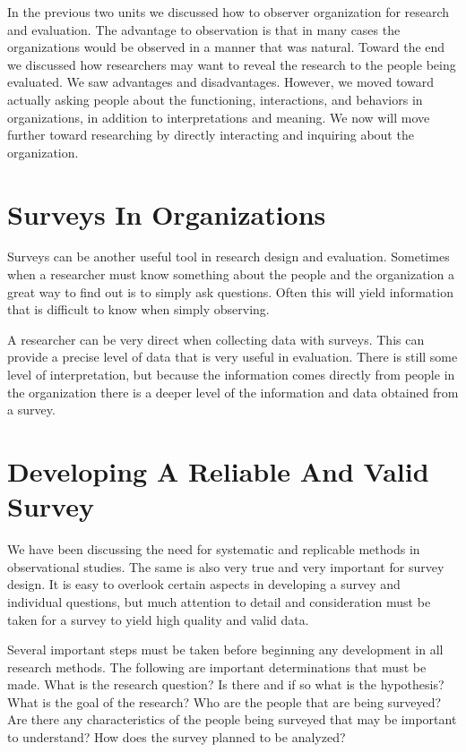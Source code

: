 \documentclass[]{book}
\theoremstyle{definition}
\theoremstyle{definition}
\theoremstyle{definition}
\theoremstyle{remark}
\begin{document}
In the previous two units we discussed how to observer organization for
research and evaluation. The advantage to observation is that in many
cases the organizations would be observed in a manner that was natural.
Toward the end we discussed how researchers may want to reveal the
research to the people being evaluated. We saw advantages and
disadvantages. However, we moved toward actually asking people about the
functioning, interactions, and behaviors in organizations, in addition
to interpretations and meaning. We now will move further toward
researching by directly interacting and inquiring about the
organization.

\hypertarget{surveys-in-organizations}{%
\section{Surveys In Organizations}\label{surveys-in-organizations}}

Surveys can be another useful tool in research design and evaluation.
Sometimes when a researcher must know something about the people and the
organization a great way to find out is to simply ask questions. Often
this will yield information that is difficult to know when simply
observing.

A researcher can be very direct when collecting data with surveys. This
can provide a precise level of data that is very useful in evaluation.
There is still some level of interpretation, but because the information
comes directly from people in the organization there is a deeper level
of the information and data obtained from a survey.

\hypertarget{developing-a-reliable-and-valid-survey}{%
\section{Developing A Reliable And Valid
Survey}\label{developing-a-reliable-and-valid-survey}}

We have been discussing the need for systematic and replicable methods
in observational studies. The same is also very true and very important
for survey design. It is easy to overlook certain aspects in developing
a survey and individual questions, but much attention to detail and
consideration must be taken for a survey to yield high quality and valid
data.

Several important steps must be taken before beginning any development
in all research methods. The following are important determinations that
must be made. What is the research question? Is there and if so what is
the hypothesis? What is the goal of the research? Who are the people
that are being surveyed? Are there any characteristics of the people
being surveyed that may be important to understand? How does the survey
planned to be analyzed?
\end{document}
